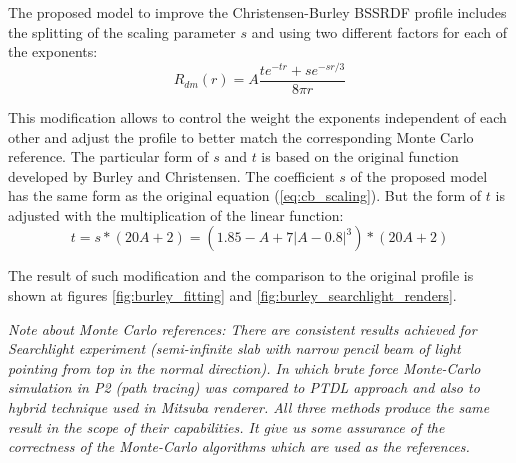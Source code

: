 The proposed model to improve the Christensen-Burley BSSRDF profile includes the splitting of the
scaling parameter $s$ and using two different factors for each of the exponents:
\begin{equation}
\label{eq:burley_modified}
R_{dm}(r) = A\dfrac{te^{-tr}+se^{-sr/3}}{8\pi r}
\end{equation}

This modification allows to control the weight the exponents independent of each other and adjust
the profile to better match the corresponding Monte Carlo reference. The particular form of $s$ and
$t$ is based on the original function developed by Burley and Christensen. The coefficient $s$ of
the proposed model has the same form as the original equation (\ref{eq:cb_scaling}). But the form of
$t$ is adjusted with the multiplication of the linear function:
\begin{equation}
\label{eq:cb_scaling_modified}
t=s*(20A+2)=(1.85-A + 7|A - 0.8|^3)*(20A+2)
\end{equation}

The result of such modification and the comparison to the original profile is shown at figures
\ref{fig:burley_fitting} and \ref{fig:burley_searchlight_renders}.

\textit{Note about Monte Carlo references:
There are consistent results achieved for Searchlight experiment
(semi-infinite slab with narrow pencil beam of light pointing from top in the normal
direction). In which brute force Monte-Carlo simulation in P2 (path tracing) was
compared to PTDL approach and also to hybrid technique used in Mitsuba
renderer. All three methods produce the same result in the scope of their
capabilities. It give us some assurance of the correctness of the Monte-Carlo
algorithms which are used as the references.}
